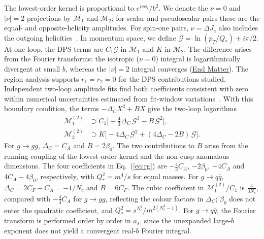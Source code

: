\documentclass[%
 twocolumn,
 superscriptaddress,
 preprintnumbers,
 nofootinbib,
 amsmath,amssymb,
 aps,
 prl,
]{revtex4-2}
\newcommand{\G}{\mathcal G}
\newcommand{\M}{\mathcal M}
\newcommand{\DD}{\Delta_C}
\begin{document}
The lowest-order kernel is proportional to $e^{i\nu\phi_b}/b^2$.
We denote the $\nu=0$ and $|\nu|=2$ projections by $\M_1$ and $\M_2$;
for scalar and pseudoscalar pairs these are the equal- and opposite-helicity
amplitudes. For spin-one pairs, $\nu=\Delta J_z$ also includes the outgoing
helicities~\cite{SM}. In momentum space, we define \(\mathcal G=\ln(p_T/Q_*)+i\pi/2\). At one loop, the DPS terms are \(C_1\mathcal G\) in \(\mathcal M_1\) and \(K\) in \(\mathcal M_2\). The difference arises from the Fourier transforms: the isotropic (\(\nu=0\)) integral is logarithmically divergent at small \(b\), whereas the \(|\nu|=2\) integral converges (\hyperref[sec:endmatter]{End Matter}).
The region analysis supports $r_1=r_2=0$ for the DPS
contributions studied. Independent two-loop amplitude fits
find both coefficients consistent with zero within numerical
uncertainties estimated from fit-window variations~\cite{SM}.
With this boundary condition, the terms $-\DD X^2+BX$ give the two-loop logarithms
\begin{equation}
\begin{aligned}
\M_1^{(2)}&\supset C_1\Big[-\tfrac43\DD\,\G^3-B\,\G^2\Big],\\
\M_2^{(2)}&\supset K\Big[-4\DD\,\G^2+(4\DD-2B)\,\G\Big].
\end{aligned}
\label{eq:rg}
\end{equation}
%
For $g\to gg$, $\DD=C_A$ and $B=2\beta_0$.
The two contributions to $B$ arise from the running
coupling of the lowest-order kernel and the non-cusp
anomalous dimensions. The four coefficients in
Eq.~(\ref{eq:rg}) are $-\frac43C_A$, $-2\beta_0$,
$-4C_A$ and $4C_A-4\beta_0$, respectively, with
$Q_*^2=m^4/s$ for equal masses.
For $g\to q\bar q$, $\DD=2C_F-C_A=-1/N_c$ and
$B=6C_F$. The cubic coefficient in $\M_1^{(2)}/C_1$
is $\frac4{3N_c}$, compared with $-\frac43C_A$
for $g\to gg$, reflecting the colour factors in
$\DD$; $\beta_0$ does not enter the quadratic
coefficient, and
$Q_*^2=s^{N_c^2}/m^{2(N_c^2-1)}$.
For $g\to q\bar q$, the Fourier transform is
performed order by order in $a_s$, since the
unexpanded large-$b$ exponent does not yield
a convergent real-$b$ Fourier integral.
\end{document}
